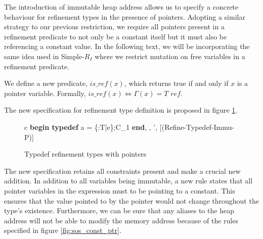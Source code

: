 \documentclass[a4paper,12pt]{report}
\begin{document}
\par
The introduction of immutable heap address allows us to specify a concrete 
behaviour for refinement types in the presence of pointers. Adopting a similar 
strategy to our previous restriction, we require all pointers present in a 
refinement predicate to not only be a constant itself but it must also be 
referencing a constant value. In the following text, we will be incorporating 
the same idea used in Simple-$R_{I}$ where we 
restrict mutation on free variables in a refinement predicate. 

\par
We define a new predicate, $is\_ref(x)$, which returns true if and only if $x$ 
is a pointer variable. Formally, $is\_ref(x) \Leftrightarrow \Gamma(x) = T\textit{ ref}$.
\par
The new specification for refinement type definition 
is proposed in figure \ref{fig:immu_pointer_typedef}.

\begin{figure}[h]
  \begin{center}
    \begin{tabular}{c}
      {\langle \textbf{begin typedef } a = \{\upsilon :T\text{ }|\text{ }e\};C_1\textbf{ end}, 
      \sigma, \tau \rangle \longrightarrow 
        \langle \sigma', \tau \rangle}[(Refine-Typedef-Immu-P)]
    \end{tabular}
  \end{center}
  \caption{Typedef refinement types with pointers}
  \label{fig:immu_pointer_typedef}
\end{figure}

\par
The new specification retains all constraints present and make a crucial 
new addition. In addition to all variables being immutable, a new rule states 
that all pointer variables in the expression must to be pointing to a constant. 
This ensures that the value pointed 
to by the pointer would not change throughout the type's existence. Furthermore, 
we can be sure that any aliases to the heap 
address will not be able to modify the memory address because of the rules 
specified in figure \ref{fig:sos_const_ptr}.
\end{document}

